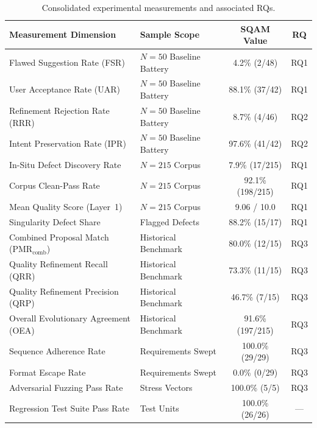 \documentclass[journal]{IEEEtran}
\begin{document}
\begin{table}[htbp]
\centering
\caption{Consolidated experimental measurements and associated RQs.}
\label{tab:summary}
\small
\setlength{\tabcolsep}{3pt}
\begin{tabularx}{\columnwidth}{@{}>{\raggedright\arraybackslash}X>{\raggedright\arraybackslash}Xcc@{}}
\toprule
\textbf{Measurement Dimension} & \textbf{Sample Scope} & \textbf{SQAM Value} & \textbf{RQ} \\
\midrule
Flawed Suggestion Rate (FSR)        & $N=50$ Baseline Battery & 4.2\% (2/48) & RQ1 \\
User Acceptance Rate (UAR)          & $N=50$ Baseline Battery & 88.1\% (37/42) & RQ1 \\
Refinement Rejection Rate (RRR)     & $N=50$ Baseline Battery & 8.7\% (4/46) & RQ2 \\
Intent Preservation Rate (IPR)      & $N=50$ Baseline Battery & 97.6\% (41/42) & RQ2 \\
In-Situ Defect Discovery Rate       & $N=215$ Corpus          & 7.9\% (17/215) & RQ1 \\
Corpus Clean-Pass Rate              & $N=215$ Corpus          & 92.1\% (198/215)& RQ1 \\
Mean Quality Score (Layer~1)        & $N=215$ Corpus          & 9.06 / 10.0  & RQ1 \\
Singularity Defect Share            & 17 Flagged Defects      & 88.2\% (15/17) & RQ1 \\
Combined Proposal Match (PMR$_{\text{comb}}$) & Historical Benchmark & 80.0\% (12/15) & RQ3 \\
Quality Refinement Recall (QRR)     & Historical Benchmark    & 73.3\% (11/15) & RQ3 \\
Quality Refinement Precision (QRP)  & Historical Benchmark    & 46.7\% (7/15)  & RQ3 \\
Overall Evolutionary Agreement (OEA)& Historical Benchmark    & 91.6\% (197/215)& RQ3 \\
Sequence Adherence Rate             & 29 Requirements Swept   & 100.0\% (29/29)& RQ3 \\
Format Escape Rate                  & 29 Requirements Swept   & 0.0\% (0/29)   & RQ3 \\
Adversarial Fuzzing Pass Rate       & 5 Stress Vectors        & 100.0\% (5/5)  & RQ3 \\
Regression Test Suite Pass Rate     & 26 Test Units           & 100.0\% (26/26)& --- \\
\bottomrule
\end{tabularx}
\end{table}
\end{document}
